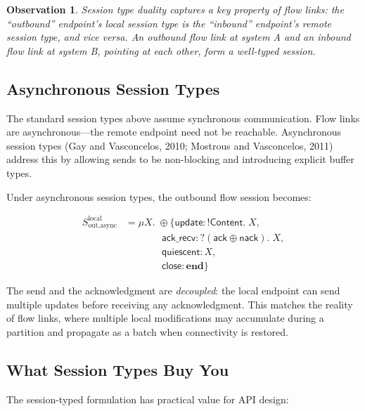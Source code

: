\documentclass[11pt]{article}
\newtheorem{observation}{Observation}
\newcommand{\sess}[1]{\mathsf{#1}}
\newcommand{\tp}[1]{\mathsf{#1}}
\newcommand{\kw}[1]{\mathbf{#1}}
\begin{document}
\begin{observation}
Session type duality captures a key property of flow links: the ``outbound''
endpoint's local session type is the ``inbound'' endpoint's remote session
type, and vice versa. An outbound flow link at system A and an inbound flow
link at system B, pointing at each other, form a well-typed session.
\end{observation}

\subsection{Asynchronous Session Types}

The standard session types above assume synchronous communication. Flow links
are asynchronous---the remote endpoint need not be reachable. Asynchronous
session types (Gay and Vasconcelos, 2010; Mostrous and Vasconcelos, 2011)
address this by allowing sends to be non-blocking and introducing explicit
buffer types.

Under asynchronous session types, the outbound flow session becomes:

\begin{align*}
  S_{\text{out,async}}^{\text{local}} &= \mu X.\; \oplus \{
    \sess{update}: !\tp{Content}.\; X, \\
    &\qquad\quad\;\;\,
    \sess{ack\_recv}: ?(\sess{ack} \oplus \sess{nack}).\; X, \\
    &\qquad\quad\;\;\,
    \sess{quiescent}: X, \\
    &\qquad\quad\;\;\,
    \sess{close}: \kw{end}
  \}
\end{align*}

The send and the acknowledgment are \emph{decoupled}: the local endpoint can
send multiple updates before receiving any acknowledgment. This matches the
reality of flow links, where multiple local modifications may accumulate during
a partition and propagate as a batch when connectivity is restored.

\subsection{What Session Types Buy You}

The session-typed formulation has practical value for API design:
\end{document}
